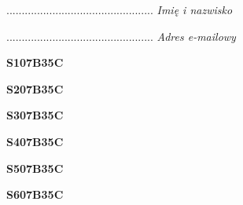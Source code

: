 \begin{turn}{90}\begin{minipage}{\linewidth} \vspace{20mm} ................................................  \textit{Imię i nazwisko}\end{minipage}\end{turn}

\begin{turn}{90}\begin{minipage}{\linewidth} \vspace{20mm} ................................................  \textit{Adres e-mailowy}\end{minipage}\end{turn}

\begin{turn}{90}\huge \begin{minipage}{\linewidth} \vspace{10mm}\textbf{S107B35C}\end{minipage}\end{turn}

\begin{turn}{90}\huge \begin{minipage}{\linewidth} \vspace{10mm}\textbf{S207B35C}\end{minipage}\end{turn}

\begin{turn}{90}\huge \begin{minipage}{\linewidth} \vspace{10mm}\textbf{S307B35C}\end{minipage}\end{turn}

\begin{turn}{90}\huge \begin{minipage}{\linewidth} \vspace{10mm}\textbf{S407B35C}\end{minipage}\end{turn}

\begin{turn}{90}\huge \begin{minipage}{\linewidth} \vspace{10mm}\textbf{S507B35C}\end{minipage}\end{turn}

\begin{turn}{90}\huge \begin{minipage}{\linewidth} \vspace{10mm}\textbf{S607B35C}\end{minipage}\end{turn}

